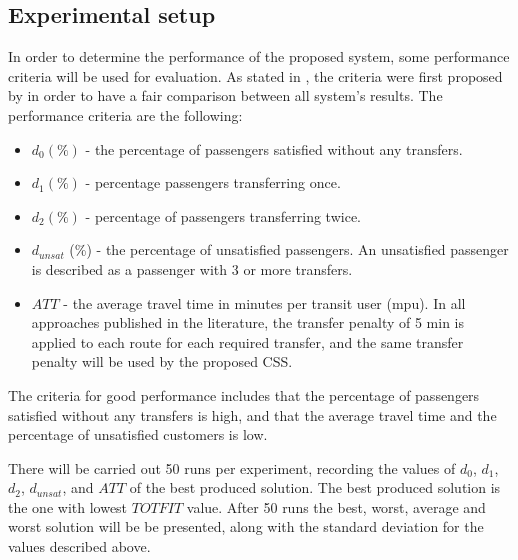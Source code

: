 \subsection{Experimental setup}
\label{subsec:performanceComparison_setup}
In order to determine the performance of the proposed system, some performance criteria will be used for evaluation. As stated in \citet{kechagiopoulos14}, the criteria were first proposed by \citet{chakroborty02} in order to have a fair comparison between all system's results. The performance criteria are %
the following:
\begin{itemize}
\item $d_0 (\%)$ - the percentage of passengers satisfied without any transfers. 
\item $d_1 (\%)$ - percentage passengers transferring once. 
\item $d_2 (\%)$ - percentage of passengers transferring twice. 
\item $d_{unsat}$ (\%) - the percentage of unsatisfied passengers. An unsatisfied passenger is described as a passenger with 3 or more transfers. 
\item $ATT$  - the average travel time in minutes per transit user (mpu). In all approaches published in the literature, the transfer penalty of 5 min is applied to each route for each required transfer, and the same transfer penalty will be used by the proposed CSS.
\end{itemize}
The criteria for good performance includes that the percentage of passengers satisfied without any transfers is high, and that the average travel time and the percentage of unsatisfied customers is low. 



There will be carried out 50 runs per experiment, recording the values of $d_0$, $d_1$, $d_2$, $d_{unsat}$, and $ATT$ of the best produced solution. The best produced solution is the one with lowest $TOTFIT$ value. After 50 runs the best, worst, average and worst solution will be be presented, along with the standard deviation for the values described above. %

